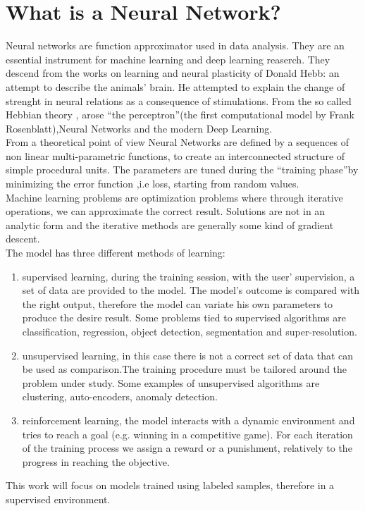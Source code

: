 \documentclass[a4paper, 10pt]{book}
\newcommand{\quotes}[1]{``#1''}
\begin{document}
\section{What is a Neural Network?}
Neural networks are function approximator used in data analysis.
They are an essential instrument for  machine learning  and deep learning reaserch. They descend  from the works on learning and neural plasticity of Donald Hebb: an attempt to describe the animals' brain.
He attempted to explain the  change of strenght in  neural relations as a consequence of stimulations.
From the so called Hebbian theory , arose \quotes {the perceptron}(the first computational model by Frank Rosenblatt),Neural Networks and the modern Deep Learning.
\\
From a theoretical point of view  Neural Networks are defined by a sequences of non linear  multi-parametric  functions, to create an interconnected structure of simple procedural units.
The parameters are tuned during the \quotes{training phase}by minimizing the error function ,i.e loss, starting from random values.
\\
Machine learning problems are optimization problems where through iterative operations, we can approximate the correct result.
Solutions are not in an analytic form and the iterative methods are generally some kind of gradient descent.
\\
The model has three different methods of learning:
\begin{enumerate}
  

\item  supervised learning, during the training session, with the user' supervision, a set of data are provided to the model.
The model's  outcome is compared with the right output, therefore the model can variate  his own parameters to produce the desire result.
Some problems tied to supervised algorithms are classification, regression, object
detection, segmentation and super-resolution.
\item unsupervised learning, in this case there is not a correct set of data that can be used as comparison.The training procedure must be tailored around the problem under study. Some examples of unsupervised algorithms are clustering, auto-encoders,
anomaly detection.
\item  reinforcement learning, the model interacts with a dynamic environment and tries to reach a goal (e.g. winning in a competitive game). For each iteration of the training process we assign a reward or a punishment, relatively to the progress in reaching the objective.
   
\end{enumerate}
This work will focus on models trained using labeled samples, therefore in a supervised environment.
\end{document}
